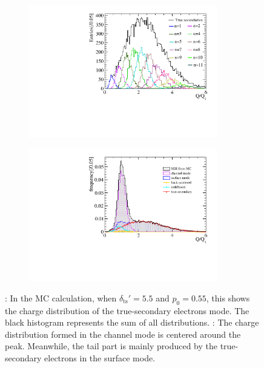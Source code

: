 \begin{figure}[htbp]
	\begin{subfigure}{0.5\textwidth}
		\includegraphics[width=0.9\textwidth]{PMTRelated/GTmodel/true_all.pdf}
		\caption{}
		\label{fig:true_n}
	\end{subfigure}%
	\hfill
	\begin{subfigure}{0.5\textwidth}
		\includegraphics[width=0.9\textwidth]{PMTRelated/GTmodel/allmode.pdf}
		\caption{}
		\label{fig:allmode}
	\end{subfigure}
	\caption{: In the MC calculation, when $\delta_{\mathrm{ts}}' = 5.5$ and $p_0 = 0.55$, this shows the charge distribution of the true-secondary electrons mode. The black histogram represents the sum of all distributions. : The charge distribution formed in the channel mode is centered around the peak. Meanwhile, the tail part is mainly produced by the true-secondary electrons in the surface mode. }
\end{figure}

